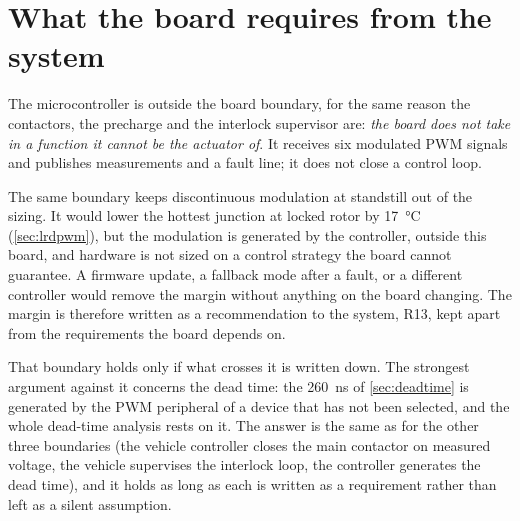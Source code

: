 \section{What the board requires from the system}
\label{sec:sysreq}

The microcontroller is outside the board boundary, for the same reason the
contactors, the precharge and the interlock supervisor are: \emph{the board
does not take in a function it cannot be the actuator of}. It receives six
modulated PWM signals and publishes measurements and a fault line; it does
not close a control loop.

The same boundary keeps discontinuous modulation at standstill out of the
sizing. It would lower the hottest junction at locked rotor by
\SI{17}{\celsius} (\cref{sec:lrdpwm}), but the modulation is generated by
the controller, outside this board, and hardware is not sized on a control
strategy the board cannot guarantee. A firmware update, a fallback mode after a fault, or a different
controller would remove the margin without anything on the board changing.
The margin is therefore written as a recommendation to the system, R13,
kept apart from the requirements the board depends on.

That boundary holds only if what crosses it is written down. The strongest
argument against it concerns the dead time: the \SI{260}{\nano\second} of
\cref{sec:deadtime} is generated by the PWM peripheral of a device that has
not been selected, and the whole dead-time analysis rests on it. The answer
is the same as for the other three boundaries (the vehicle controller
closes the main contactor on measured voltage, the vehicle supervises the
interlock loop, the controller generates the dead time), and it holds as
long as each is written as a requirement rather than left as a silent
assumption.

